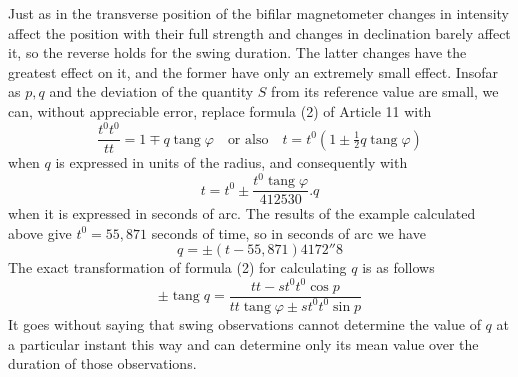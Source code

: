 Just as in the transverse position of the bifilar magnetometer changes in intensity affect the position with their full strength and changes in declination barely affect it, so the reverse holds for the swing duration. The latter changes have the greatest effect on it, and the former have only an extremely small effect. Insofar as $p,q$ and the deviation of the quantity $S$ from its reference value are small, we can, without appreciable error, replace formula (2) of Article 11 with
\[
\frac{t^0t^0}{tt}=1\mp q\operatorname{tang}\varphi\quad\text{or also}\quad t=t^0(1\pm\tfrac12q\operatorname{tang}\varphi)
\]
when $q$ is expressed in units of the radius, and consequently with
\[
t=t^0\pm\frac{t^0\operatorname{tang}\varphi}{412530}.q
\]
when it is expressed in seconds of arc. The results of the example calculated above give $t^0=55{,}871$ seconds of time, so in seconds of arc we have
\[
q=\pm(t-55{,}871)4172''8
\]
The exact transformation of formula (2) for calculating $q$ is as follows
\[
\pm\operatorname{tang}q=\frac{tt-st^0t^0\cos p}{tt\operatorname{tang}\varphi\pm st^0t^0\sin p}
\]
It goes without saying that swing obser\-vations cannot determine the value of $q$ at a particular instant this way and can determine only its mean value over the duration of those observations.

